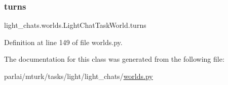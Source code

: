 \subsubsection{\texorpdfstring{turns}{turns}}
{\footnotesize\ttfamily light\+\_\+chats.\+worlds.\+Light\+Chat\+Task\+World.\+turns}



Definition at line 149 of file worlds.\+py.



The documentation for this class was generated from the following file\+:\begin{DoxyCompactItemize}
\item 
parlai/mturk/tasks/light/light\+\_\+chats/\hyperlink{parlai_2mturk_2tasks_2light_2light__chats_2worlds_8py}{worlds.\+py}\end{DoxyCompactItemize}
